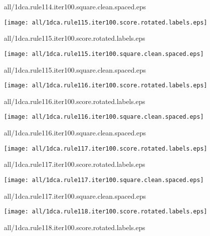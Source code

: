 \documentclass{article}
\begin{document}
{\footnotesize all/1dca.rule114.iter100.square.clean.spaced.eps}
\begin{center}
\begin{minipage}{\textwidth}
\texttt{[image: all/1dca.rule115.iter100.score.rotated.labels.eps]}
\end{minipage}
\end{center}
{\footnotesize all/1dca.rule115.iter100.score.rotated.labels.eps}
\begin{center}
\begin{minipage}{\textwidth}
\texttt{[image: all/1dca.rule115.iter100.square.clean.spaced.eps]}
\end{minipage}
\end{center}
{\footnotesize all/1dca.rule115.iter100.square.clean.spaced.eps}
\begin{center}
\begin{minipage}{\textwidth}
\texttt{[image: all/1dca.rule116.iter100.score.rotated.labels.eps]}
\end{minipage}
\end{center}
{\footnotesize all/1dca.rule116.iter100.score.rotated.labels.eps}
\begin{center}
\begin{minipage}{\textwidth}
\texttt{[image: all/1dca.rule116.iter100.square.clean.spaced.eps]}
\end{minipage}
\end{center}
{\footnotesize all/1dca.rule116.iter100.square.clean.spaced.eps}
\begin{center}
\begin{minipage}{\textwidth}
\texttt{[image: all/1dca.rule117.iter100.score.rotated.labels.eps]}
\end{minipage}
\end{center}
{\footnotesize all/1dca.rule117.iter100.score.rotated.labels.eps}
\begin{center}
\begin{minipage}{\textwidth}
\texttt{[image: all/1dca.rule117.iter100.square.clean.spaced.eps]}
\end{minipage}
\end{center}
{\footnotesize all/1dca.rule117.iter100.square.clean.spaced.eps}
\begin{center}
\begin{minipage}{\textwidth}
\texttt{[image: all/1dca.rule118.iter100.score.rotated.labels.eps]}
\end{minipage}
\end{center}
{\footnotesize all/1dca.rule118.iter100.score.rotated.labels.eps}
\end{document}
